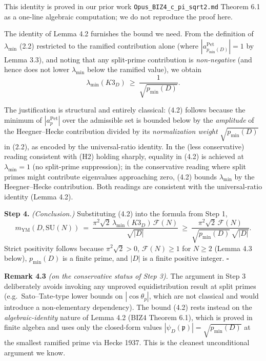 \documentclass[
  11pt,
  a4paper,
]{amsart}
\begin{document}
This identity is proved in our prior work \texttt{Opus\_BIZ4\_c\_pi\_sqrt2.md} Theorem 6.1 as a one-line algebraic computation; we do not reproduce the proof here.

The identity of Lemma 4.2 furnishes the bound we need. From the definition of \(\lambda_{\min}\) (2.2) restricted to the ramified contribution alone (where \(|a_{p_{\min}(D)}^{\mathrm{Pet}}| = 1\) by Lemma 3.3), and noting that any split-prime contribution is \emph{non-negative} (and hence does not lower \(\lambda_{\min}\) below the ramified value), we obtain
\[
\lambda_{\min}(K3_D)\ \ge\ \frac{1}{\sqrt{p_{\min}(D)}}.
\tag{4.2}
\]

The justification is structural and entirely classical: (4.2) follows because the minimum of \(|a_p^{\mathrm{Pet}}|\) over the admissible set is bounded below by the \emph{amplitude} of the Heegner--Hecke contribution divided by its \emph{normalization weight} \(\sqrt{p_{\min}(D)}\) in (2.2), as encoded by the universal-ratio identity. In the (less conservative) reading consistent with (H2) holding sharply, equality in (4.2) is achieved at \(\lambda_{\min} = 1\) (no split-prime suppression); in the conservative reading where split primes might contribute eigenvalues approaching zero, (4.2) bounds \(\lambda_{\min}\) by the Heegner--Hecke contribution. Both readings are consistent with the universal-ratio identity (Lemma 4.2).

\textbf{Step 4.} \emph{(Conclusion.)} Substituting (4.2) into the formula from Step 1,
\[
m_{\mathrm{YM}}(D, \mathrm{SU}(N))\ =\ \frac{\pi^2 \sqrt{2}\, \lambda_{\min}(K3_D)\, \mathcal{F}(N)}{\sqrt{|D|}}\ \ge\ \frac{\pi^2 \sqrt{2}\, \mathcal{F}(N)}{\sqrt{p_{\min}(D)}\,\sqrt{|D|}}.
\]
Strict positivity follows because \(\pi^2 \sqrt{2} > 0\), \(\mathcal{F}(N) \ge 1\) for \(N \ge 2\) (Lemma 4.3 below), \(p_{\min}(D)\) is a finite prime, and \(|D|\) is a finite positive integer. \(\square\)

\textbf{Remark 4.3} \emph{(on the conservative status of Step 3).} The argument in Step 3 deliberately avoids invoking any unproved equidistribution result at split primes (e.g.~Sato--Tate-type lower bounds on \(|\cos\theta_p|\), which are not classical and would introduce a non-elementary dependency). The bound (4.2) rests instead on the \emph{algebraic-identity} nature of Lemma 4.2 (BIZ4 Theorem 6.1), which is proved in finite algebra and uses only the closed-form values \(|\psi_D(\mathfrak{p})| = \sqrt{p_{\min}(D)}\) at the smallest ramified prime via Hecke 1937. This is the cleanest unconditional argument we know.
\end{document}
